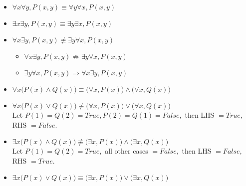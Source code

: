 \documentclass{article}
\begin{document}
\begin{itemize}
\item $\forall x\forall y, P(x,y)\equiv\forall y\forall x, P(x,y)$ 
\item $\exists x\exists y, P(x,y)\equiv\exists y\exists x, P(x,y)$ 
\item $\forall x\exists y, P(x,y)\not\equiv\exists y\forall x, P(x,y)$
\begin{itemize}
	\item $\forall x\exists y, P(x,y)\not\Longrightarrow \exists y\forall x, P(x,y)$
	\item $\exists y\forall x, P(x,y)\Longrightarrow \forall x\exists y, P(x,y)$
\end{itemize}
\item $\forall x \big(P(x)\land Q(x)\big)\equiv\big(\forall x, P(x)\big)\land\big(\forall x, Q(x)\big)$
\item $\forall x \big(P(x)\lor Q(x)\big)\not\equiv\big(\forall x, P(x)\big)\lor\big(\forall x, Q(x)\big)$ \\
Let $P(1) = Q(2) = True, P(2) = Q(1) = False,$ then LHS $= True$, RHS $= False.$
\item $\exists x \big(P(x)\land Q(x)\big)\not\equiv\big(\exists x, P(x)\big)\land\big(\exists x, Q(x)\big)$ \\
Let $P(1) = Q(2) = True,$ all other cases $= False,$ then LHS $= False$, RHS $= True.$
\item $\exists x \big(P(x)\lor Q(x)\big)\equiv\big(\exists x, P(x)\big)\lor\big(\exists x, Q(x)\big)$ \\
\end{itemize}
\end{document}
